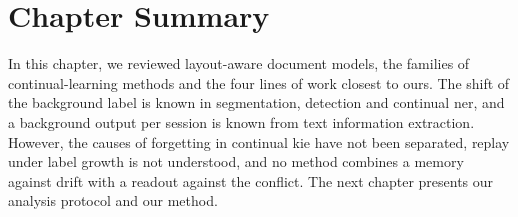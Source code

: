 \section{Chapter Summary}
\label{sec:c2-s9}

In this chapter, we reviewed layout-aware document models, the families of
continual-learning methods and the four lines of work closest to ours. The shift of the
background label is known in segmentation, detection and continual \gls{ner}, and a
background output per session is known from text information extraction. However, the
causes of forgetting in continual \gls{kie} have not been separated, replay under label
growth is not understood, and no method combines a memory against drift with a readout
against the conflict. The next chapter presents our analysis protocol and our method.
